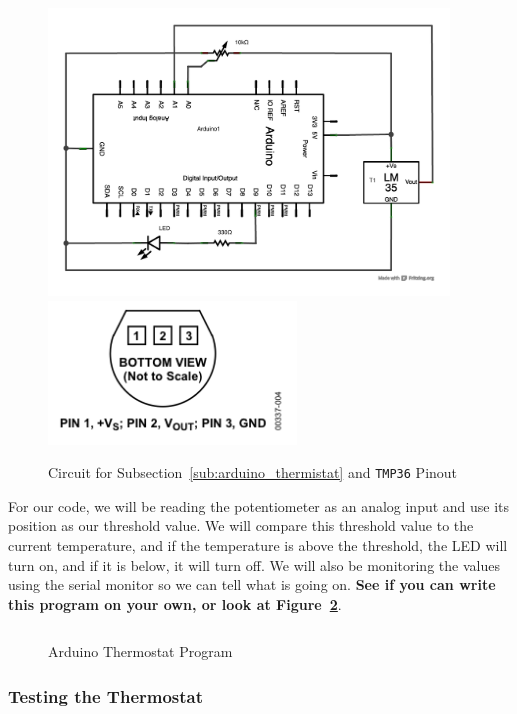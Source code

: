 \documentclass[11pt,a4paper]{article}
\begin{document}
\begin{figure}[htbp]
    \centering
        \includegraphics[height=3in]{figures/temp-led.pdf}\includegraphics[height=1.5in]{figures/tmp35.png}
        \caption{Circuit for Subsection~\ref{sub:arduino_thermistat} and \texttt{TMP36} Pinout}
    \label{fig:figures_temp-led}
\end{figure}

For our code, we will be reading the potentiometer as an analog input and use its position as our threshold value.  We will compare this threshold value to the current temperature, and if the temperature is above the threshold, the LED will turn on, and if it is below, it will turn off.  We will also be monitoring the values using the serial monitor so we can tell what is going on.  \textbf{See if you can write this program on your own, or look at Figure~\ref{fig:temp_led_code}}.

\begin{figure}[htbp]
	\centering
\inputminted[mathescape,linenos,numbersep=5pt,gobble=0,frame=lines,framesep=2mm]{c}{code/thermostat/thermostat.ino}
	\caption{Arduino Thermostat Program}
	\label{fig:temp_led_code}
\end{figure}

\subsubsection{Testing the Thermostat} %
\label{ssub:testing_the_thermostat}
\end{document}
